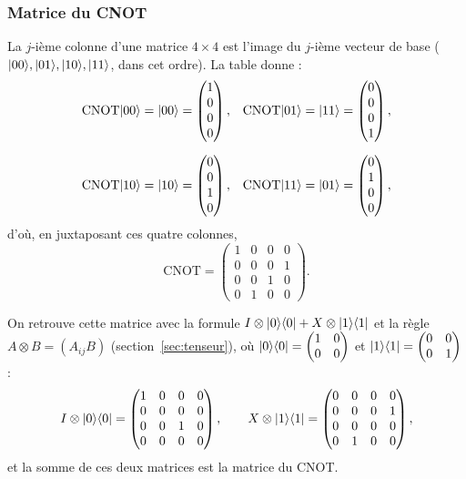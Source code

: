 \subsubsection{Matrice du CNOT}

La $j$-ième colonne d'une matrice $4\times4$ est l'image du $j$-ième vecteur de base
($|00\rangle,|01\rangle,|10\rangle,|11\rangle$, dans cet ordre). La table donne :
\begin{align*}
  \mathrm{CNOT}|00\rangle&=|00\rangle=\begin{pmatrix}1\\0\\0\\0\end{pmatrix},&
  \mathrm{CNOT}|01\rangle&=|11\rangle=\begin{pmatrix}0\\0\\0\\1\end{pmatrix},\\[1.5ex]
  \mathrm{CNOT}|10\rangle&=|10\rangle=\begin{pmatrix}0\\0\\1\\0\end{pmatrix},&
  \mathrm{CNOT}|11\rangle&=|01\rangle=\begin{pmatrix}0\\1\\0\\0\end{pmatrix},
\end{align*}
d'où, en juxtaposant ces quatre colonnes,
\[
  \mathrm{CNOT}=\begin{pmatrix}
    1 & 0 & 0 & 0\\ 0 & 0 & 0 & 1\\ 0 & 0 & 1 & 0\\ 0 & 1 & 0 & 0
  \end{pmatrix}.
\]

On retrouve cette matrice avec la formule $I\otimes|0\rangle\langle 0|+X\otimes|1\rangle\langle 1|$ et
la règle $A\otimes B=(A_{ij}B)$ (section~\ref{sec:tenseur}), où
$|0\rangle\langle 0|=\begin{pmatrix}1&0\\0&0\end{pmatrix}$ et
$|1\rangle\langle 1|=\begin{pmatrix}0&0\\0&1\end{pmatrix}$ :
\[
  I\otimes|0\rangle\langle 0|=\begin{pmatrix}1&0&0&0\\0&0&0&0\\0&0&1&0\\0&0&0&0\end{pmatrix},
  \qquad
  X\otimes|1\rangle\langle 1|=\begin{pmatrix}0&0&0&0\\0&0&0&1\\0&0&0&0\\0&1&0&0\end{pmatrix},
\]
et la somme de ces deux matrices est la matrice du CNOT.

